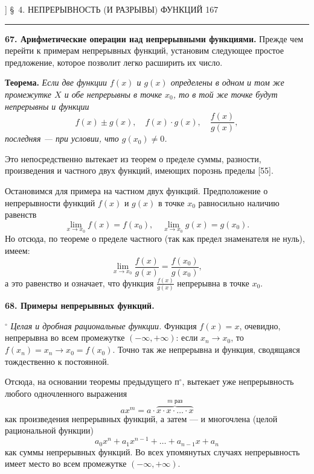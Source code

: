 \documentclass[a4paper,12pt]{article}
\begin{document}
] \hfill \S~4. НЕПРЕРЫВНОСТЬ (И РАЗРЫВЫ) ФУНКЦИЙ \hfill 167
\vspace{0.5em}
\hrule
\vspace{1em}

\noindent \textbf{67. Арифметические операции над непрерывными функциями.} Прежде чем перейти к примерам непрерывных функций, установим следующее простое предложение, которое позволит легко расширить их число.

\vspace{0.5em}
\noindent \textbf{Теорема.} \textit{Если две функции $f(x)$ и $g(x)$ определены в одном и том же промежутке $X$ и обе непрерывны в точке $x_0$, то в той же точке будут непрерывны и функции}
\begin{equation*}
    f(x) \pm g(x), \quad f(x) \cdot g(x), \quad \frac{f(x)}{g(x)},
\end{equation*}
\textit{последняя --- при условии, что $g(x_0) \neq 0$.}

Это непосредственно вытекает из теорем о пределе суммы, разности, произведения и частного двух функций, имеющих порознь пределы [55].

Остановимся для примера на частном двух функций. Предположение о непрерывности функций $f(x)$ и $g(x)$ в точке $x_0$ равносильно наличию равенств
\begin{equation*}
    \lim_{x \to x_0} f(x) = f(x_0), \quad \lim_{x \to x_0} g(x) = g(x_0).
\end{equation*}
Но отсюда, по теореме о пределе частного (так как предел знаменателя не нуль), имеем:
\begin{equation*}
    \lim_{x \to x_0} \frac{f(x)}{g(x)} = \frac{f(x_0)}{g(x_0)},
\end{equation*}
а это равенство и означает, что функция $\frac{f(x)}{g(x)}$ непрерывна в точке $x_0$.

\vspace{1em}
\noindent \textbf{68. Примеры непрерывных функций.}

$^\circ$ \textit{Целая и дробная рациональные функции.} Функция $f(x) = x$, очевидно, непрерывна во всем промежутке $(-\infty, +\infty)$: если $x_n \to x_0$, то $f(x_n) = x_n \to x_0 = f(x_0)$. Точно так же непрерывна и функция, сводящаяся тождественно к постоянной.

Отсюда, на основании теоремы предыдущего п$^\circ$, вытекает уже непрерывность любого одночленного выражения
\begin{equation*}
    ax^m = a \cdot \overbrace{x \cdot x \cdot \dots \cdot x}^{m \text{ раз}}
\end{equation*}
как произведения непрерывных функций, а затем --- и многочлена (целой рациональной функции)
\begin{equation*}
    a_0x^n + a_1x^{n-1} + \dots + a_{n-1}x + a_n
\end{equation*}
как суммы непрерывных функций. Во всех упомянутых случаях непрерывность имеет место во всем промежутке $(-\infty, +\infty)$.
\end{document}
